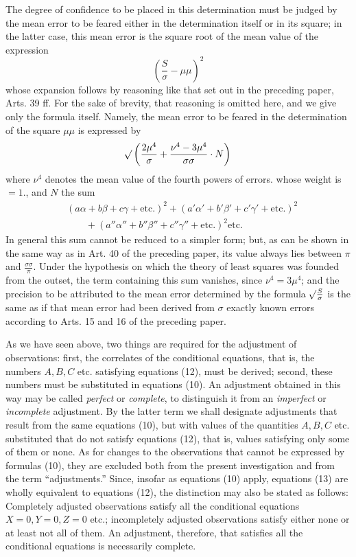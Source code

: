 The degree of confidence to be placed in this determination must be judged by the mean error to be feared either in the determination itself or in its square; in the latter case, this mean error is the square root
of the mean value of the expression
\[
\left(\frac S\sigma-\mu\mu\right)^2
\]
whose expansion follows by reasoning like that set out in the preceding paper, Arts. 39 ff. For the sake of brevity, that reasoning is omitted here, and we give only the formula itself. Namely, the mean error to be feared in the determination of the square \(\mu\mu\) is expressed by
\[
\mathord{{}^{}\!\surd}\left(\frac{2\mu^4}{\sigma}+\frac{\nu^4-3\mu^4}{\sigma\sigma}\cdot N\right)
\]
where \(\nu^4\) denotes the mean value of the fourth powers of errors. whose weight is \(=1.\), and \(N\) the sum
\[
\begin{aligned}
&(a\alpha+b\beta+c\gamma+\text{etc.})^2+(a'\alpha'+b'\beta'+c'\gamma'+\text{etc.})^2\\
&\qquad+(a''\alpha''+b''\beta''+c''\gamma''+\text{etc.})^2\text{etc.}
\end{aligned}
\]
In general this sum cannot be reduced to a simpler form; but, as can be shown in the same way as in Art. 40 of the preceding paper, its value always lies between \(\pi\) and \(\frac{\sigma\sigma}{\pi}\). Under the hypothesis on which the theory of least squares was founded from the outset, the term containing this sum vanishes, since \(\nu^4=3\mu^4\); and the precision to be attributed to the mean error determined by the formula \(\mathord{{}^{}\!\surd}\frac S\sigma\) is the same as if that mean error had been derived from \(\sigma\) exactly known errors according to Arts. 15 and 16 of the preceding paper.

As we have seen above, two things are required for the adjustment of observations: first, the correlates of the conditional equations, that is, the numbers \(A,B,C\) etc. satisfying equations (12), must be derived; second, these numbers must be substituted in equations (10). An adjustment obtained in this way may be called \textit{perfect} or \textit{complete}, to distinguish it from an \textit{imperfect} or \textit{incomplete} adjustment. By the latter term we shall designate adjustments that result from the same equations (10), but with values of the quantities \(A,B,C\) etc. substituted that do not satisfy equations (12), that is, values satisfying only some of them or none. As for changes to the observations that cannot be expressed by formulas (10), they are excluded both from the present investigation and from the term “adjustments.” Since, insofar as equations (10) apply, equations (13) are wholly equivalent to equations (12), the distinction may also be stated as follows: 
Completely adjusted observations satisfy all the conditional equations \(X=0,\allowbreak Y=0,\allowbreak Z=0\) etc.; incompletely adjusted observations satisfy either none or at least not all of them. An adjustment, therefore, that satisfies all the conditional equations is necessarily complete.

